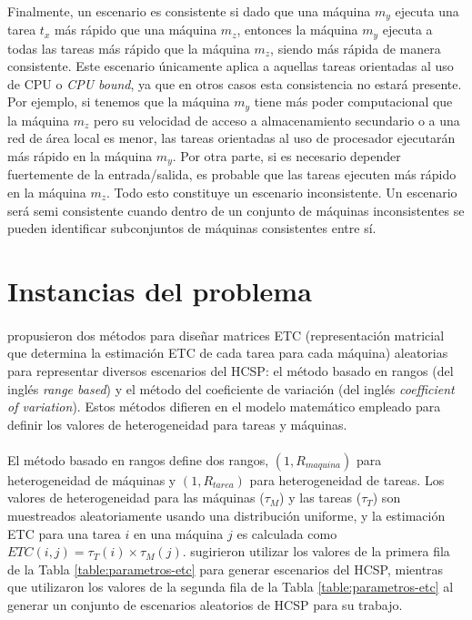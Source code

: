 \newpage %

\paragraph{}Finalmente, un escenario es consistente si dado que una máquina $m_y$ ejecuta una tarea $t_x$ más rápido que una máquina $m_z$, entonces la máquina $m_y$ ejecuta a todas las tareas más rápido que la máquina $m_z$, siendo más rápida de manera consistente.
Este escenario únicamente aplica a aquellas tareas orientadas al uso de CPU o \textit{CPU bound}, ya que en otros casos esta consistencia no estará presente.
Por ejemplo, si tenemos que la máquina $m_y$ tiene más poder computacional que la máquina $m_z$ pero su velocidad de acceso a almacenamiento secundario o a una red de área local es menor, las tareas orientadas al uso de procesador ejecutarán más rápido en la máquina $m_y$.
Por otra parte, si es necesario depender fuertemente de la entrada/salida, es probable que las tareas ejecuten más rápido en la máquina $m_z$.
Todo esto constituye un escenario inconsistente.
Un escenario será semi consistente cuando dentro de un conjunto de máquinas inconsistentes se pueden identificar subconjuntos de máquinas consistentes entre sí.

\section{Instancias del problema} \label{section:descripcion-problema,subsection:instancias-del-problema}

\paragraph{}\citet{bib-ali-hc-etc} propusieron dos métodos para diseñar matrices ETC (representación matricial que determina la estimación ETC de cada tarea para cada máquina) aleatorias para representar diversos escenarios del HCSP: el método basado en rangos (del inglés \textit{range based}) y el método del coeficiente de variación (del inglés \textit{coefficient of variation}). Estos métodos difieren en el modelo matemático empleado para definir los valores de heterogeneidad para tareas y máquinas.

\paragraph{}El método basado en rangos define dos rangos, $(1, R_{maquina})$ para heterogeneidad de máquinas y $(1, R_{tarea})$ para heterogeneidad de tareas.
Los valores de heterogeneidad para las máquinas ($\tau_{M}$) y las tareas ($\tau_{T}$) son muestreados aleatoriamente usando una distribución uniforme, y la estimación ETC para una tarea $i$ en una máquina $j$ es calculada como $ETC(i,j) = \tau_{T}(i) \times \tau_{M}(j)$.
\citet{bib-ali-hc-etc} sugirieron utilizar los valores de la primera fila de la Tabla \ref{table:parametros-etc} para generar escenarios del HCSP, mientras que \citet{bib-braun} utilizaron los valores de la segunda fila de la Tabla \ref{table:parametros-etc} al generar un conjunto de escenarios aleatorios de HCSP para su trabajo.

